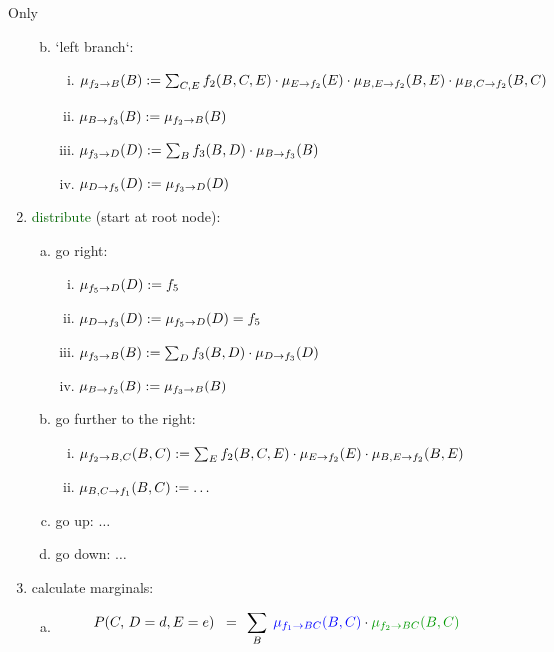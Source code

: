 \begin{frame}{Only}
\begin{enumerate}
\begin{enumerate}[(a)]
\begin{enumerate}[(i)]
  \end{enumerate}
  \item<only@5> `left branch`:
  \begin{enumerate}[(i)]
  \item $\mu_{f_{2}\rightarrow B}(B) := \sum_{C,E} f_{2}(B,C,E) \cdot \mu_{E\rightarrow f_{2}}(E) \cdot \mu_{B,E\rightarrow f_{2}}(B,E) \cdot \mu_{B,C\rightarrow f_{2}}(B,C)$
  \item $\mu_{B\rightarrow f_{3}}(B) := \mu_{f_{2}\rightarrow B}(B)$
  \item $\mu_{f_{3}\rightarrow D}(D) := \sum_{B} f_{3}(B,D) \cdot \mu_{B\rightarrow f_{3}}(B)$
  \item $\mu_{D\rightarrow f_{5}}(D) := \mu_{f_{3}\rightarrow D}(D)$
  \end{enumerate}
 \end{enumerate}
 \item<only@6->  \textcolor{darkgreen}{distribute} (start at root node):
 \begin{enumerate}[(a)]
  \item<only@7> go right:
  \begin{enumerate}[(i)]
    \item $\mu_{f_{5}\rightarrow D}(D) := f_{5}$
    \item $\mu_{D\rightarrow f_{3}}(D) := \mu_{f_{5}\rightarrow D}(D) = f_{5}$
    \item $\mu_{f_{3}\rightarrow B}(B) := \sum_{D} f_{3}(B,D) \cdot \mu_{D\rightarrow f_{3}}(D)$  
    \item $\mu_{B\rightarrow f_{2}}(B) := \mu_{f_{3}\rightarrow B}(B)$    
    \end{enumerate}
  \item<only@8-9> go further to the right:
  \begin{enumerate}[(i)]
  \item $\mu_{f_{2}\rightarrow B,C}(B,C) := \sum_{E} f_{2}(B,C,E) \cdot \mu_{E\rightarrow f_{2}}(E) \cdot \mu_{B,E\rightarrow f_{2}}(B,E)$
  \item $\mu_{B,C\rightarrow f_{1}}(B,C) := \ldots$ 
  \end{enumerate}
  \item<only@9> go up: $\ldots$
  \item<only@9> go down: $\ldots$
  \end{enumerate}
  \item<only@10> calculate marginals:
  \begin{enumerate}[(a)]
  \item \begin{align}
					P(C, \,D = d, E = e) 
						\;\; =& \;\; \sum_{B}{} \;
							{\color{blue}\mu_{f_1 \to BC}(B,C)} \cdot 
							{\color{darkgreen} \mu_{f_2 \to BC}(B,C)} 
		\end{align}

\end{enumerate}
\end{enumerate}
\end{frame}
